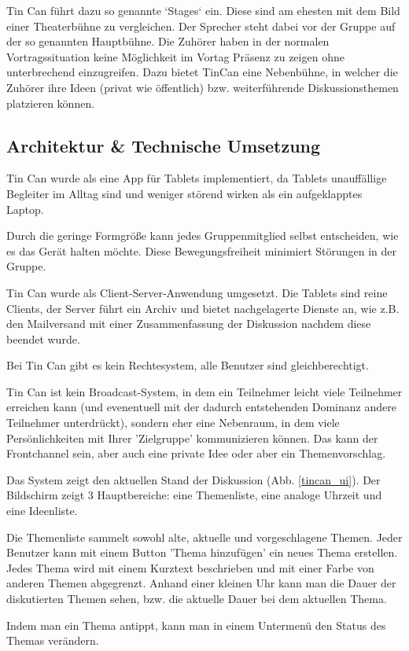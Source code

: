 Tin Can führt dazu so genannte `Stages` ein. Diese sind am ehesten mit dem Bild
einer Theaterbühne zu vergleichen. Der Sprecher steht dabei vor der Gruppe auf
der so genannten Hauptbühne. Die Zuhörer haben in der
normalen Vortragssituation keine Möglichkeit im Vortag Präsenz zu zeigen ohne
unterbrechend einzugreifen. Dazu bietet TinCan eine Nebenbühne, in welcher die
Zuhörer ihre Ideen (privat wie öffentlich) bzw. weiterführende Diskussionsthemen
platzieren können.
 
\subsection{Architektur \& Technische Umsetzung}
Tin Can wurde als eine App für Tablets implementiert, da Tablets unauffällige
Begleiter im Alltag sind und weniger störend wirken als ein aufgeklapptes
Laptop.

Durch die geringe Formgröße kann jedes Gruppenmitglied selbst entscheiden, wie es
das Gerät halten möchte. Diese Bewegungsfreiheit minimiert Störungen in der
Gruppe.

Tin Can wurde als Client-Server-Anwendung umgesetzt. Die Tablets sind reine
Clients, der Server führt ein Archiv und bietet nachgelagerte Dienste an, wie
z.B. den Mailversand mit einer Zusammenfassung der Diskussion nachdem diese
beendet wurde.

Bei Tin Can gibt es kein Rechtesystem, alle Benutzer sind gleichberechtigt.

Tin Can ist kein Broadcast-System, in dem ein Teilnehmer leicht viele Teilnehmer
erreichen kann (und evenentuell mit der dadurch entstehenden Dominanz andere
Teilnehmer unterdrückt), sondern eher eine Nebenraum, in dem viele
Persönlichkeiten mit Ihrer 'Zielgruppe' kommunizieren können. Das kann der
Frontchannel sein, aber auch eine private Idee oder aber ein Themenvorschlag.

Das System zeigt den aktuellen Stand der Diskussion (Abb. \ref{tincan_ui}). Der Bildschirm zeigt 3
Hauptbereiche: eine Themenliste, eine analoge Uhrzeit und eine Ideenliste.

Die Themenliste sammelt sowohl alte, aktuelle und vorgeschlagene Themen. Jeder
Benutzer kann mit einem Button 'Thema hinzufügen' ein neues Thema 
erstellen. Jedes Thema wird mit einem Kurztext beschrieben und mit einer Farbe 
von anderen Themen abgegrenzt. Anhand einer kleinen Uhr kann man die Dauer der 
diskutierten Themen sehen, bzw. die aktuelle Dauer bei dem aktuellen Thema.

Indem man ein Thema antippt, kann man in einem Untermenü den Status des Themas
verändern.

